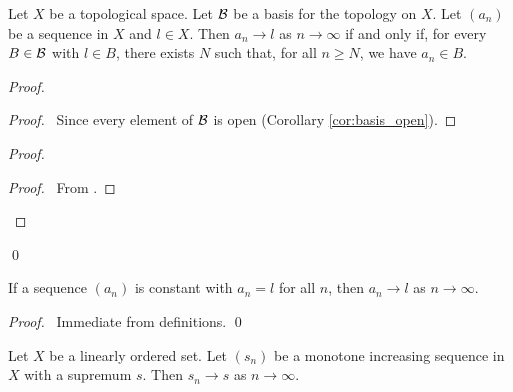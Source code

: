 \begin{proposition}
    \label{proposition:convergence_basis}
    Let $X$ be a topological space. Let $\mathcal{B}$ be a basis for the topology on $X$.
    Let $(a_n)$ be a sequence in $X$ and $l \in X$. Then $a_n \rightarrow l$ as
    $n \rightarrow \infty$ if and only if, for every $B \in \mathcal{B}$ with $l \in B$,
    there exists $N$ such that, for all $n \geq N$, we have $a_n \in B$.
\end{proposition}

\begin{proof}
    \pf
    \begin{proof}
        \pf\ Since every element of $\mathcal{B}$ is open (Corollary \ref{cor:basis_open}).
    \end{proof}
    \begin{proof}
        \begin{proof}
            \pf\ From .
        \end{proof}
    \end{proof}
    \qed
\end{proof}

\begin{lemma}
    \label{lemma:converge_constant}
    If a sequence $(a_n)$ is constant with $a_n = l$ for all $n$, then $a_n \rightarrow l$ as $n \rightarrow \infty$.
\end{lemma}

\begin{proof}
    \pf\ Immediate from definitions. \qed
\end{proof}

\begin{theorem}
    Let $X$ be a linearly ordered set. Let $(s_n)$ be a monotone increasing sequence in $X$ with a supremum $s$.
    Then $s_n \rightarrow s$ as $n \rightarrow \infty$.
\end{theorem}


